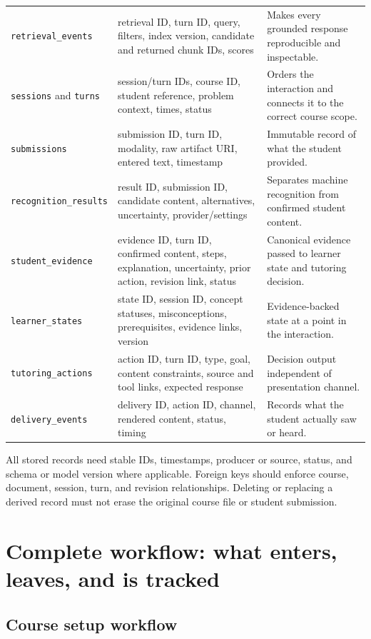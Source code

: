 \documentclass[11pt]{article}
\begin{document}
\begin{longtable}{@{}p{}p{}p{}@{}}
\texttt{retrieval\_events} & retrieval ID, turn ID, query, filters, index version, candidate and returned chunk IDs, scores & Makes every grounded response reproducible and inspectable. \\
\texttt{sessions} and \texttt{turns} & session/turn IDs, course ID, student reference, problem context, times, status & Orders the interaction and connects it to the correct course scope. \\
\texttt{submissions} & submission ID, turn ID, modality, raw artifact URI, entered text, timestamp & Immutable record of what the student provided. \\
\texttt{recognition\_}\allowbreak\texttt{results} & result ID, submission ID, candidate content, alternatives, uncertainty, provider/settings & Separates machine recognition from confirmed student content. \\
\texttt{student\_evidence} & evidence ID, turn ID, confirmed content, steps, explanation, uncertainty, prior action, revision link, status & Canonical evidence passed to learner state and tutoring decision. \\
\texttt{learner\_states} & state ID, session ID, concept statuses, misconceptions, prerequisites, evidence links, version & Evidence-backed state at a point in the interaction. \\
\texttt{tutoring\_actions} & action ID, turn ID, type, goal, content constraints, source and tool links, expected response & Decision output independent of presentation channel. \\
\texttt{delivery\_events} & delivery ID, action ID, channel, rendered content, status, timing & Records what the student actually saw or heard. \\
\bottomrule
\end{longtable}
\normalsize

All stored records need stable IDs, timestamps, producer or source, status, and schema or model version where applicable. Foreign keys should enforce course, document, session, turn, and revision relationships. Deleting or replacing a derived record must not erase the original course file or student submission.

\section{Complete workflow: what enters, leaves, and is tracked}

\subsection{Course setup workflow}
\end{document}
